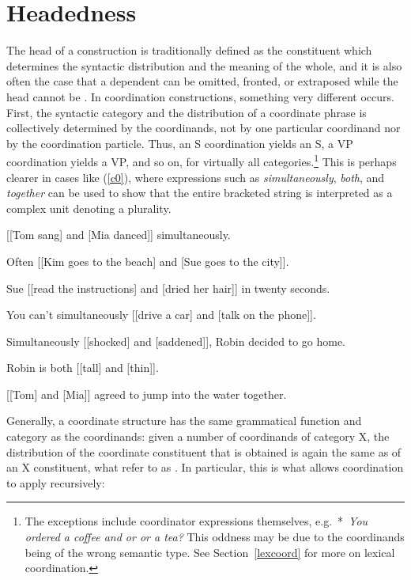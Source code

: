 \section{Headedness}
\label{coord:sec-headedness}

The head of a construction is traditionally defined as the constituent which determines the syntactic distribution and the meaning of the whole, and it is also often the case that a dependent can be omitted, fronted, or extraposed while the head cannot be \citep{zwicky85}. In coordination constructions, something very different occurs. First, the syntactic category and the distribution of a coordinate phrase is collectively determined by the coordinands, not by one particular coordinand nor by the coordination particle. Thus, an S coordination yields an S, a VP coordination yields a VP, and so on, for virtually all categories.\footnote{The exceptions include coordinator expressions themselves, e.g.\ *~\emph{You ordered a coffee and or or a tea?} This oddness may be due to the coordinands being of the wrong semantic type. See Section~\ref{lexcoord} for more on lexical coordination.}
This is perhaps clearer in cases like (\ref{c0}), where
expressions such as \emph{simultaneously}, \emph{both}, and
\emph{together} can be used to show that the entire bracketed string
is interpreted as a complex unit denoting a plurality.


\eal
\label{c0}
\ex{} [[Tom sang] and [Mia danced]] simultaneously.

\ex{} Often [[Kim goes to the beach] and [Sue goes to the city]].

\ex{} Sue [[read the instructions] and [dried her hair]] in twenty seconds.

\ex{} You can't simultaneously [[drive a car] and [talk on the phone]].

\ex{} Simultaneously [[shocked] and [saddened]], Robin decided to go home.

\ex Robin is both [[tall] and [thin]].

\ex{} [[Tom] and [Mia]] agreed to jump into the water together.
\zl


Generally, a coordinate structure has the same grammatical function and category as the coordinands:
given a number of coordinands of category X, the distribution of the coordinate constituent that is
obtained is again the same as of an X constituent, what \citet[]{pullumzwicky} refer to as .
In particular, this is what allows coordination to apply recursively:

